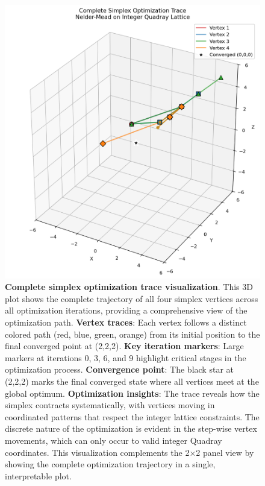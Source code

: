 \documentclass[
  10pt,
]{article}
\begin{document}
\begin{figure}
\centering
\includegraphics{../output/figures/simplex_trace_visualization.png}
\caption{\textbf{Complete simplex optimization trace visualization}.
This 3D plot shows the complete trajectory of all four simplex vertices
across all optimization iterations, providing a comprehensive view of
the optimization path. \textbf{Vertex traces}: Each vertex follows a
distinct colored path (red, blue, green, orange) from its initial
position to the final converged point at (2,2,2). \textbf{Key iteration
markers}: Large markers at iterations 0, 3, 6, and 9 highlight critical
stages in the optimization process. \textbf{Convergence point}: The
black star at (2,2,2) marks the final converged state where all vertices
meet at the global optimum. \textbf{Optimization insights}: The trace
reveals how the simplex contracts systematically, with vertices moving
in coordinated patterns that respect the integer lattice constraints.
The discrete nature of the optimization is evident in the step-wise
vertex movements, which can only occur to valid integer Quadray
coordinates. This visualization complements the 2×2 panel view by
showing the complete optimization trajectory in a single, interpretable
plot.}
\end{figure}
\end{document}
